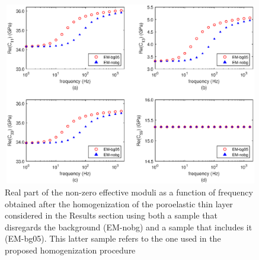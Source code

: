 \documentclass[draft]{agujournal2019}
\begin{document}
\begin{figure}[!ht]
\centering
        \includegraphics[width= 120mm, height=80mm]{cijbgcompare_2sandshale.eps}
\caption{Real part of the non-zero effective moduli as a function of frequency obtained after the homogenization of the poroelastic thin layer considered in the Results section using  both a sample that disregards the background (EM-nobg) and a sample that includes it (EM-bg05). This latter sample refers to the one used in the proposed homogenization procedure}
\label{fig.4}
\end{figure}
\end{document}
